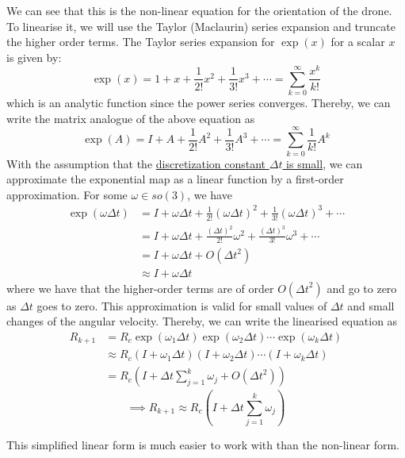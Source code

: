 We can see that this is the non-linear equation for the orientation of the drone.
To linearise it, we will use the Taylor (Maclaurin) series expansion and truncate the higher order terms.
The Taylor series expansion for \( \exp(x) \) for a scalar \( x \) is given by:
\begin{equation*}
    \exp(x)
    =
    1 + x + \frac{1}{2!} x^2 + \frac{1}{3!} x^3 + \cdots
    =
    \sum_{k=0}^{\infty} \frac{x^k}{k!}
\end{equation*}
which is an analytic function since the power series converges.
Thereby, we can write the matrix analogue of the above equation as
\begin{equation*}
    \exp(A)
    =
    I + A + \frac{1}{2!} A^2 + \frac{1}{3!} A^3 + \cdots
    =
    \sum_{k=0}^{\infty} \frac{1}{k!} A^k
\end{equation*}
With the assumption that the \underline{discretization constant \( \Delta t \) is small}, we can approximate the exponential map as a linear function by a first-order approximation.
For some \( \omega \in so(3)\), we have
\begin{align*}
    \exp(\omega \Delta t)
     & =
    I + \omega \Delta t + \frac{1}{2!} {(\omega \Delta t)}^2 + \frac{1}{3!} {(\omega \Delta t)}^3 + \cdots
    \\ & =
    I + \omega \Delta t + \frac{{(\Delta t)}^2}{2!} \omega^2 + \frac{{(\Delta t)}^3}{3!} \omega^3 + \cdots
    \\ & =
    I + \omega \Delta t + O({\Delta t}^2)
    \\
     & \approx
    I + \omega \Delta t
\end{align*}
where we have that the higher-order terms are of order \( O({\Delta t}^2) \) and go to zero as \( \Delta t \) goes to zero.
This approximation is valid for small values of \( \Delta t \) and small changes of the angular velocity.
Thereby, we can write the linearised equation as
\begin{align*}
    R_{k+1}
     & =
    R_c \exp(\omega_1 \Delta t) \exp(\omega_2 \Delta t) \cdots \exp(\omega_k \Delta t)
    \\ & \approx
    R_c (I + \omega_1 \Delta t) (I + \omega_2 \Delta t) \cdots (I + \omega_k \Delta t)
    \\ & =
    R_c \left( I + \Delta t \sum_{j=1}^{k} \omega_j + O({\Delta t}^2) \right)
\end{align*}
\begin{equation*}
    \implies
    \boxed{
        R_{k+1}
        \approx
        R_c \left( I + \Delta t \sum_{j=1}^{k} \omega_j \right)
    }
\end{equation*}

This simplified linear form is much easier to work with than the non-linear form.
